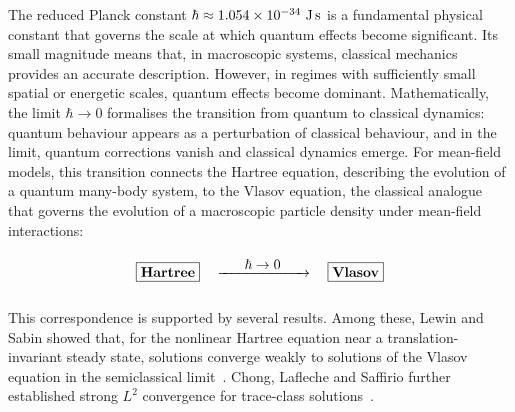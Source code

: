 The reduced Planck constant $\hbar\approx 1.054\times 10^{-34}\text{ J\,s}$ is a fundamental physical constant that governs the scale at which quantum effects become significant. Its small magnitude means that, in macroscopic systems, classical mechanics provides an accurate description. However, in regimes with sufficiently small spatial or energetic scales, quantum effects become dominant. Mathematically, the limit $\hbar\to0$ formalises the transition from quantum to classical dynamics: quantum behaviour appears as a perturbation of classical behaviour, and in the limit, quantum corrections vanish and classical dynamics emerge. For mean-field models, this transition connects the Hartree equation, describing the evolution of a quantum many-body system, to the Vlasov equation, the classical analogue that governs the evolution of a macroscopic particle density under mean-field interactions:
\begin{align*}
\vphantom{\begin{pmatrix}
1\\2\\3
\end{pmatrix}}\fbox{\text{\textbf{Hartree}}}\quad\xrightarrow{\hspace{0.6cm}\textstyle\hbar\to0\hspace{0.6cm}}\quad\fbox{\text{\textbf{Vlasov}}}
\end{align*}
This correspondence is supported by several results. Among these, Lewin and Sabin showed that, for the nonlinear Hartree equation near a translation-invariant steady state, solutions converge weakly to solutions of the Vlasov equation in the semiclassical limit~\cite{LewinSabin2020}. Chong, Lafleche and Saffirio further established strong $L^2$ convergence for trace-class solutions~\cite{ChongLaflecheSaffirio2023}.

